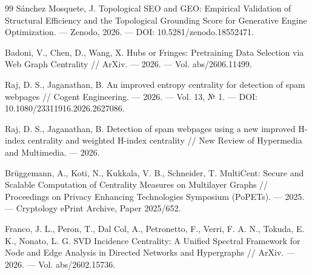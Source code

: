 \documentclass[12pt, a4paper]{article}
\begin{document}
\begin{thebibliography}{99}
 Sánchez Mosquete, J. Topological SEO and GEO: Empirical Validation of Structural Efficiency and the Topological Grounding Score for Generative Engine Optimization. — Zenodo, 2026. — DOI: 10.5281/zenodo.18552471.

 Badoni, V., Chen, D., Wang, X. Hubs or Fringes: Pretraining Data Selection via Web Graph Centrality // ArXiv. — 2026. — Vol. abs/2606.11499.

 Raj, D. S., Jaganathan, B. An improved entropy centrality for detection of spam webpages // Cogent Engineering. — 2026. — Vol. 13, № 1. — DOI: 10.1080/23311916.2026.2627086.

 Raj, D. S., Jaganathan, B. Detection of spam webpages using a new improved H-index centrality and weighted H-index centrality // New Review of Hypermedia and Multimedia. — 2026.

 Brüggemann, A., Koti, N., Kukkala, V. B., Schneider, T. MultiCent: Secure and Scalable Computation of Centrality Measures on Multilayer Graphs // Proceedings on Privacy Enhancing Technologies Symposium (PoPETs). — 2025. — Cryptology ePrint Archive, Paper 2025/652.

 Franco, J. L., Peron, T., Dal Col, A., Petronetto, F., Verri, F. A. N., Tokuda, E. K., Nonato, L. G. SVD Incidence Centrality: A Unified Spectral Framework for Node and Edge Analysis in Directed Networks and Hypergraphs // ArXiv. — 2026. — Vol. abs/2602.15736.

\end{thebibliography}
\end{document}
